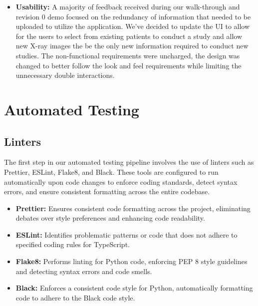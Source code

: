 \documentclass[12pt, titlepage]{article}
\begin{document}
\begin{itemize}
    \item \textbf{Usability:} A majority of feedback received during our walk-through and revision 0 demo focused on the redundancy of information that needed to be uploaded to utilize the application. We've decided to update the UI to allow for the users to select from existing patients to conduct a study and allow new X-ray images the be the only new information required to conduct new studies. The non-functional requirements were uncharged, the design was changed to better follow the look and feel requirements while limiting the unnecessary double interactions. 
\end{itemize}

\section{Automated Testing}
\subsection{Linters}
The first step in our automated testing pipeline involves the use of linters such as Prettier, ESLint, Flake8, and Black. These tools are configured to run automatically upon code changes to enforce coding standards, detect syntax errors, and ensure consistent formatting across the entire codebase.
\begin{itemize}
    \item \textbf{Prettier:} Ensures consistent code formatting across the project, eliminating debates over style preferences and enhancing code readability.
    \item \textbf{ESLint:} Identifies problematic patterns or code that does not adhere to specified coding rules for TypeScript.
    \item \textbf{Flake8:} Performs linting for Python code, enforcing PEP 8 style guidelines and detecting syntax errors and code smells.
    \item \textbf{Black:} Enforces a consistent code style for Python, automatically formatting code to adhere to the Black code style. 
\end{itemize}
\end{document}
